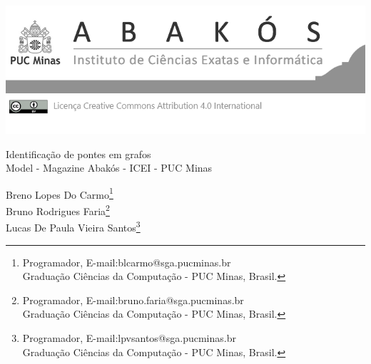 \documentclass[a4paper,12pt,Times]{article}
\makeatletter
\newcommand{\monog}{Identificação de pontes em grafos}
\newcommand{\monogES}{Model - Magazine Abakós - ICEI - PUC Minas}
\newcommand{\origem}{Brasil}
\newcommand{\AutorA}{Breno Lopes Do Carmo}
\newcommand{\funcaoA}{Programador}
\newcommand{\emailA}{blcarmo@sga.pucminas.br}
\newcommand{\cursA}{Graduação Ciências da Computação - PUC Minas}
\newcommand{\AutorB}{Bruno Rodrigues Faria}
\newcommand{\funcaoB}{Programador}
\newcommand{\emailB}{bruno.faria@sga.pucminas.br}
\newcommand{\cursB}{Graduação Ciências da Computação - PUC Minas}
\newcommand{\AutorC}{Lucas De Paula Vieira Santos}
\newcommand{\funcaoC}{Programador}
\newcommand{\emailC}{lpvsantos@sga.pucminas.br}
\newcommand{\cursC}{Graduação Ciências da Computação - PUC Minas}
\newcommand{\keyword}[1]{\textsf{#1}}
\makeatother
\begin{document}

\begin{flushleft}

\begin{minipage} [c][5cm][b]{16.5cm}
\includegraphics[scale=1.1]{figuras/pucmg.png} 
\end{minipage}

 \vspace{0cm} {
 \singlespacing \Large{\monog {} \\ }
  \normalsize{\monogES}
 }
\end{flushleft}
\begin{flushright}
\singlespacing 
\normalsize{\AutorA \footnote{\funcaoA, E-mail:\emailA \\ \cursA, \origem. }} \\
\normalsize{\AutorB \footnote{\funcaoB, E-mail:\emailB \\ \cursB, \origem. }} \\
\normalsize{\AutorC \footnote{\funcaoC, E-mail:\emailC \\ \cursC, \origem. }} \\
\end{flushright}
\thispagestyle{empty}

\begin{abstract}
\noindent
O artigo trata da identificação em pontes usando dois algoritmos, o algoritmo Naive e o \cite{tarjan}, para que possa ser analisado a diferença entre esses algoritmos e o seu tempo de execução, para N quantidade de vértices. Diante disso, foram utilizados os algoritmos de identificação de pontes para identificar um caminho euleriano em um grafo qualquer, onde esses grafos quaisquer são criados de forma aleatória sendo eles, eulerianos, semi-euleriano e não euleriano, levando em consideração um  grafo  simples  não-direcionado G=(V, E), em que V representa o conjunto de vértices e E o conjunto de arestas.
\\\textbf{\keyword{Palavras-chave: }}Grafos. Pontes. Busca. Euleriano. Complexidade. Naive. Tarjan. 
\end{abstract}
\end{document}
